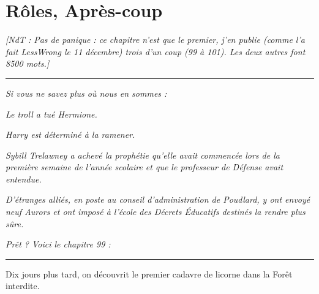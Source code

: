 
\chapter{Rôles, Après-coup}

\emph{[NdT : Pas de panique : ce chapitre n'est que le premier, j'en publie (comme l'a fait LessWrong le 11 décembre) trois d'un coup (99 à 101). Les deux autres font 8500 mots.]} 
\par\noindent\rule{\textwidth}{0.4pt}
\emph{Si vous ne savez plus où nous en sommes :} 

\emph{Le troll a tué Hermione.} 

\emph{Harry est déterminé à la ramener.} 

\emph{Sybill Trelawney a achevé la prophétie qu'elle avait commencée lors de la première semaine de l'année scolaire et que le professeur de Défense avait entendue.} 

\emph{D'étranges alliés, en poste au conseil d'administration de Poudlard, y ont envoyé neuf Aurors et ont imposé à l'école des Décrets Éducatifs destinés la rendre plus sûre.} 

\emph{Prêt ? Voici le chapitre 99 :} 
\par\noindent\rule{\textwidth}{0.4pt}
Dix jours plus tard, on découvrit le premier cadavre de licorne dans la Forêt interdite.

